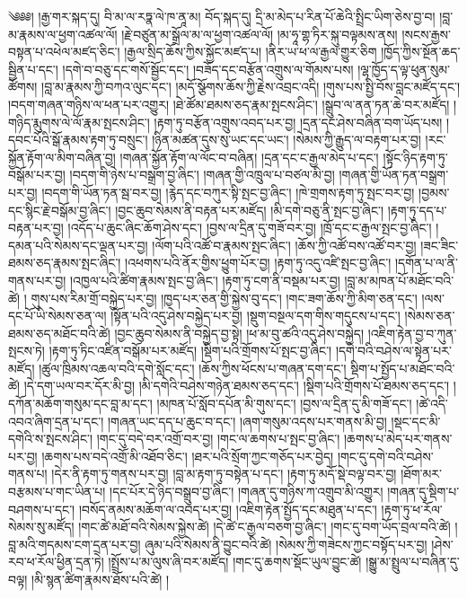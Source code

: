 \setcounter{footnote}{0} 
༄༅༅། །རྒྱ་གར་སྐད་དུ། བི་མ་ལ་རཏྣ་ལེ་ཁ་ནཱ་མ། བོད་སྐད་དུ། དྲི་མ་མེད་པ་རིན་པོ་ཆེའི་སྤྲིང་ཡིག་ཅེས་བྱ་བ། །བླ་མ་རྣམས་ལ་ཕྱག་འཚལ་ལོ། །རྗེ་བཙུན་མ་སྒྲོལ་མ་ལ་ཕྱག་འཚལ་ལོ། །མ་ཧཱ་གྷ་ཏིར་སྐུ་བལྟམས་ནས། །སངས་རྒྱས་བསྟན་པ་འཕེལ་མཛད་ཅིང་། །རྒྱལ་སྲིད་ཆོས་ཀྱིས་སྐྱོང་མཛད་པ། །ནིར་ཡ་ཕ་ལ་རྒྱལ་གྱུར་ཅིག །ཁྱོད་ཀྱིས་སྔོན་ཆད་སྦྱིན་པ་དང་། །དགེ་བ་བཅུ་དང་གསོ་སྦྱོང་དང་། །བཟོད་དང་བརྩོན་འགྲུས་ལ་གོམས་པས། །ལྷ་ཁྱོད་ད་ལྟ་ཕུན་སུམ་ཚོགས། །བླ་མ་རྣམས་ཀྱི་བཀའ་ལུང་དང་། །མདོ་སྩོགས་ཆོས་ཀྱི་རྗེས་འབྲང་འདི། །གུས་པས་སྤྱི་བོས་བླང་མཛོད་དང་། །བདག་གཞན་གཉིས་ལ་ཕན་པར་འགྱུར། །ཐེ་ཚོམ་ཐམས་ཅད་རྣམ་སྤངས་ཤིང་། །སྒྲུབ་ལ་ནན་ཏན་ཆེ་བར་མཛོད། །གཉིད་རྨུགས་ལེ་ལོ་རྣམ་སྤངས་ཤིང་། །རྟག་ཏུ་བརྩོན་འགྲུས་འབད་པར་བྱ། །དྲན་དང་ཤེས་བཞིན་བག་ཡོད་པས། །དབང་པོའི་སྒོ་རྣམས་རྟག་ཏུ་བསྲུང་། །ཉིན་མཚན་དུས་སུ་ཡང་དང་ཡང་། །སེམས་ཀྱི་རྒྱུད་ལ་བརྟག་པར་བྱ། །རང་སྐྱོན་རྟོག་ལ་མིག་བཞིན་བྱ། །གཞན་སྐྱོན་རྟོག་ལ་ལོང་བ་བཞིན། །དྲན་དང་ང་རྒྱལ་མེད་པ་དང་། །སྟོང་ཉིད་རྟག་ཏུ་བསྒོམ་པར་བྱ། །བདག་གི་ཉེས་པ་བསྒྲག་བྱ་ཞིང་། །གཞན་གྱི་འཁྲུལ་པ་བཙལ་མི་བྱ། །གཞན་གྱི་ཡོན་ཏན་བསྒྲག་པར་བྱ། །བདག་གི་ཡོན་ཏན་སྦ་བར་བྱ། །རྙེད་དང་བཀུར་སྟི་སྤང་བྱ་ཞིང་། །ཁེ་གྲགས་རྟག་ཏུ་སྤང་བར་བྱ། །བྱམས་དང་སྙིང་རྗེ་བསྒོམ་བྱ་ཞིང་། །བྱང་ཆུབ་སེམས་ནི་བརྟན་པར་མཛོད། །མི་དགེ་བཅུ་ནི་སྤང་བྱ་ཞིང་། །རྟག་ཏུ་དད་པ་བརྟན་པར་བྱ། །འདོད་པ་ཆུང་ཞིང་ཆོག་ཤེས་དང་། །བྱས་ལ་དྲིན་དུ་གཟོ་བར་བྱ། །ཁྲོ་དང་ང་རྒྱལ་སྤང་བྱ་ཞིང་། །དམན་པའི་སེམས་དང་ལྡན་པར་བྱ། །ལོག་པའི་འཚོ་བ་རྣམས་སྤང་ཞིང་། །ཆོས་ཀྱི་འཚོ་བས་འཚོ་བར་བྱ། །ཟང་ཟིང་ཐམས་ཅད་རྣམས་སྤང་ཞིང་། །འཕགས་པའི་ནོར་གྱིས་ཕྱུག་པོར་བྱ། །རྟག་ཏུ་འདུ་འཛི་སྤང་བྱ་ཞིང་། །དགོན་པ་ལ་ནི་གནས་པར་བྱ། །འཁྱལ་པའི་ཚིག་རྣམས་སྤང་བྱ་ཞིང་། །རྟག་ཏུ་ངག་ནི་བསྡམ་པར་བྱ། །བླ་མ་མཁན་པོ་མཐོང་བའི་ཚེ། །
གུས་པས་རིམ་གྲོ་བསྐྱེད་པར་བྱ། །ཁྱད་པར་ཅན་གྱི་སྐྱེས་བུ་དང་། །གང་ཟག་ཆོས་ཀྱི་མིག་ཅན་དང་། །ལས་དང་པོ་ཡི་སེམས་ཅན་ལ། །སྟོན་པའི་འདུ་ཤེས་བསྐྱེད་པར་བྱ། །སྡུག་བསྔལ་དག་གིས་གདུངས་པ་དང་། །སེམས་ཅན་ཐམས་ཅད་མཐོང་བའི་ཚེ། །བྱང་ཆུབ་སེམས་ནི་བསྐྱེད་བྱ་སྟེ། །ཕ་མ་བུ་ཚའི་འདུ་ཤེས་བསྐྱེད། །འཇིག་རྟེན་བྱ་བ་ཀུན་སྤངས་ཏེ། །རྟག་ཏུ་ཏིང་འཛིན་བསྒོམ་པར་མཛོད། །སྡིག་པའི་གྲོགས་པོ་སྤང་བྱ་ཞིང་། །དགེ་བའི་བཤེས་ལ་སྟེན་པར་མཛོད། །ཚུལ་ཁྲིམས་འཆལ་བའི་དགེ་སློང་དང་། །ཆོས་ཀྱིས་ཕོངས་པ་གཞན་དག་དང་། སྡིག་པ་སྤྱོད་པ་མཐོང་བའི་ཚེ། །དེ་དག་ཡལ་བར་དོར་མི་བྱ། །མི་དགེའི་བཤེས་གཉེན་ཐམས་ཅད་དང་། །སྡིག་པའི་གྲོགས་པོ་ཐམས་ཅད་དང་། །དཀོན་མཆོག་གསུམ་དང་བླ་མ་དང་། །མཁན་པོ་སློབ་དཔོན་མི་གུས་དང་། །བྱས་ལ་དྲིན་དུ་མི་གཟོ་དང་། །ཚེ་འདི་འབའ་ཞིག་དྲན་པ་དང་། །གཞན་ཡང་དད་པ་ཆུང་བ་དང་། །ཞག་གསུམ་འདས་པར་གནས་མི་བྱ། །སྡང་དང་མི་དགེའི་ས་སྤངས་ཤིང་། །གང་དུ་བདེ་བར་འགྲོ་བར་བྱ། །གང་ལ་ཆགས་པ་སྤང་བྱ་ཞིང་། །ཆགས་པ་མེད་པར་གནས་པར་བྱ། །ཆགས་པས་བདེ་འགྲོ་མི་འཐོབ་ཅིང་། །ཐར་པའི་སྲོག་ཀྱང་གཅོད་པར་བྱེད། །གང་དུ་དགེ་བའི་བཤེས་གནས་པ། །དེར་ནི་རྟག་ཏུ་གནས་པར་བྱ། །བླ་མ་རྟག་ཏུ་བསྟེན་པ་དང་། །རྟག་ཏུ་མདོ་སྡེ་བལྟ་བར་བྱ། །ཐོག་མར་བརྩམས་པ་གང་ཡིན་པ། །དང་པོར་དེ་ཉིད་བསྒྲུབ་བྱ་ཞིང་། །གཞན་དུ་གཉིས་ཀ་འགྲུབ་མི་འགྱུར། །གཞན་དུ་སྡིག་པ་བཤགས་པ་དང་། །བསོད་ནམས་མཆོག་ལ་འབད་པར་བྱ། །འཇིག་རྟེན་སྤྱོད་དང་མཐུན་པ་དང་། །རྟག་ཏུ་ཕ་རོལ་སེམས་སུ་མཛོད། །གང་ཚེ་མཐོ་བའི་སེམས་སྐྱེས་ཚེ། །དེ་ཚེ་ང་རྒྱལ་བཅག་བྱ་ཞིང་། །གང་དུ་བག་ཡོད་བྲལ་བའི་ཚེ། །བླ་མའི་གདམས་ངག་དྲན་པར་བྱ། ཞུམ་པའི་སེམས་ནི་བྱུང་བའི་ཚེ། །སེམས་ཀྱི་གཟེངས་ཀྱང་བསྟོད་པར་བྱ། །ཤེས་རབ་ཕ་རོལ་ཕྱིན་དྲན་ཏེ། །སྤྲོས་པ་མ་ལུས་ཞི་བར་མཛོད། །གང་དུ་ཆགས་སྡོང་ཡུལ་བྱུང་ཚེ། །སྒྱུ་མ་སྤྲུལ་པ་བཞིན་དུ་བལྟ། །མི་སྙན་ཚིག་རྣམས་ཐོས་པའི་ཚེ། །
